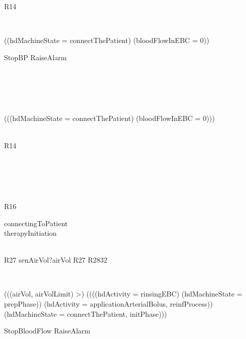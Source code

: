 \begin{circus}
\begin{block}
\begin{block}
			\end{block}\\
			
	\end{block}\\
	
	R14 \circdef \\
	\begin{block}
		\\
			\begin{block}
				\lcircguard ((hdMachineState = {connectThePatient}) \land (bloodFlowInEBC = 0)) \rcircguard \circguard \\
					\begin{block}
						StopBP \interleave RaiseAlarm
					\end{block}\\
					
			\end{block}\\
			 \extchoice \\
			\begin{block}
				\lcircguard \lnot (((hdMachineState = {connectThePatient}) \land (bloodFlowInEBC = 0))) \rcircguard \circguard \\
					\begin{block}
						\Skip\\ \circseq R14
					\end{block}\\
					
			\end{block}\\
			
	\end{block}\\
	
	R16 \circdef \\
	\begin{block}
		connectingToPatient \then \Skip\\ \circseq therapyInitiation \then \Skip\\
	\end{block}\\
	
	R27 \circdef senAirVol?airVol \then R27
	R2832 \circdef \\
	\begin{block}
		\\
			\begin{block}
				\lcircguard (((airVol, airVolLimit) \in >) \land ((((hdActivity = {rinsingEBC}) \land (hdMachineState = {prepPhase})) \lor (hdActivity = {applicationArterialBolus, reinfProcess})) \lor (hdMachineState = {connectThePatient, initPhase}))) \rcircguard \circguard \\
					\begin{block}
						StopBloodFlow \interleave RaiseAlarm
					\end{block}\\
					

\end{block}
\end{block}
\end{circus}
